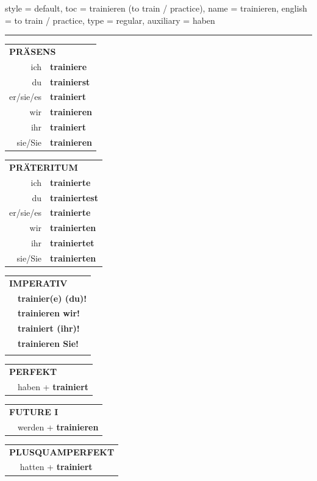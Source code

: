\begin{verbentry}{
  style = {default},
  toc = {trainieren (to train / practice)},
  name = {trainieren},
  english = {to train / practice},
  type = {regular},
  auxiliary = {haben}
}
 
    
     \vspace{5pt}
    \hrule
    \vspace{5pt}

  \begin{tabular}{rl}
     \multicolumn{2}{l}{\textbf{PRÄSENS} }\\
    ich & \textbf{trainiere}\\
    du & \textbf{trainierst}\\
    er/sie/es & \textbf{trainiert}\\
    wir & \textbf{trainieren}\\
    ihr & \textbf{trainiert}\\
    sie/Sie & \textbf{trainieren}\\
  \end{tabular}
  \hfill
     \begin{tabular}{rl}
    \multicolumn{2}{l}{\textbf{PRÄTERITUM} }\\
    ich & \textbf{trainierte}\\
    du & \textbf{trainiertest}\\
    er/sie/es & \textbf{trainierte}\\
    wir & \textbf{trainierten}\\
    ihr & \textbf{trainiertet}\\
    sie/Sie & \textbf{trainierten}\\
  \end{tabular}
  \hfill
  \begin{tabular}{rl}
     \multicolumn{2}{l}{\textbf{IMPERATIV} }\\
   & \textbf{trainier(e) (du)!}\\
   & \textbf{trainieren wir!}\\
   & \textbf{trainiert (ihr)!}\\
   & \textbf{trainieren Sie!}\\
   & \vspace{10pt}
  \end{tabular}

 \vspace{10pt}

 \begin{tabular}{rl}
     \multicolumn{2}{l}{\textbf{PERFEKT}}\\
   & haben + \textbf{trainiert}\\
  \end{tabular}
\hfill
   \begin{tabular}{rl}
    \multicolumn{2}{l}{\textbf{FUTURE I}}\\
   & werden + \textbf{trainieren}\\
  \end{tabular}
\hfill
   \begin{tabular}{rl}
      \multicolumn{2}{l}{\textbf{PLUSQUAMPERFEKT}}\\
   & hatten + \textbf{trainiert}\\
  \end{tabular}


\end{verbentry}
